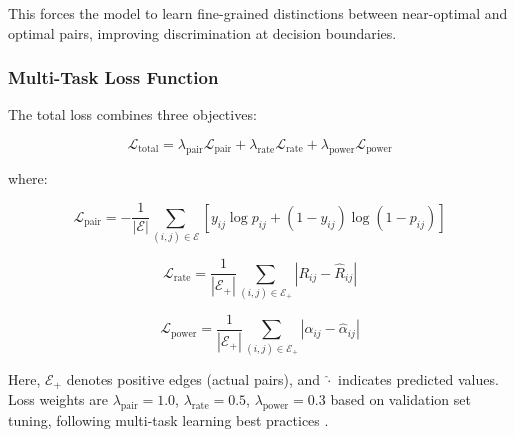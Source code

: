\documentclass[conference]{IEEEtran}
\begin{document}
This forces the model to learn fine-grained distinctions between near-optimal and optimal pairs, improving discrimination at decision boundaries.

\subsubsection{Multi-Task Loss Function}

The total loss combines three objectives:

\begin{equation}
\mathcal{L}_{\text{total}} = \lambda_{\text{pair}} \mathcal{L}_{\text{pair}} + \lambda_{\text{rate}} \mathcal{L}_{\text{rate}} + \lambda_{\text{power}} \mathcal{L}_{\text{power}}
\end{equation}

where:

\begin{equation}
\mathcal{L}_{\text{pair}} = -\frac{1}{|\mathcal{E}|} \sum_{(i,j) \in \mathcal{E}} \left[ y_{ij} \log p_{ij} + (1-y_{ij}) \log(1-p_{ij}) \right]
\end{equation}

\begin{equation}
\mathcal{L}_{\text{rate}} = \frac{1}{|\mathcal{E}_+|} \sum_{(i,j) \in \mathcal{E}_+} |R_{ij} - \hat{R}_{ij}|
\end{equation}

\begin{equation}
\mathcal{L}_{\text{power}} = \frac{1}{|\mathcal{E}_+|} \sum_{(i,j) \in \mathcal{E}_+} |\alpha_{ij} - \hat{\alpha}_{ij}|
\end{equation}

Here, $\mathcal{E}_+$ denotes positive edges (actual pairs), and $\hat{\cdot}$ indicates predicted values. Loss weights are $\lambda_{\text{pair}} = 1.0$, $\lambda_{\text{rate}} = 0.5$, $\lambda_{\text{power}} = 0.3$ based on validation set tuning, following multi-task learning best practices \cite{naparstek2019deep}.


\end{document}
